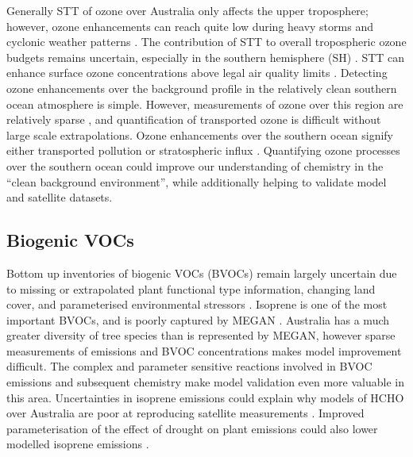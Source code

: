     Generally STT of ozone over Australia only affects the upper troposphere; however, ozone enhancements can reach quite low during heavy storms and cyclonic weather patterns \parencite{Alexander2013}.
    The contribution of STT to overall tropospheric ozone budgets remains uncertain, especially in the southern hemisphere (SH) \parencite{Skerlak2014}.
    STT can enhance surface ozone concentrations above legal air quality limits \parencite[e.g.][]{Lelieveld2009,Lin2015}.
    Detecting ozone enhancements over the background profile in the relatively clean southern ocean atmosphere is simple.
    However, measurements of ozone over this region are relatively sparse \parencite{Skerlak2014}, and quantification of transported ozone is difficult without large scale extrapolations.
    Ozone enhancements over the southern ocean signify either transported pollution or stratospheric influx \parencite{Jacobson2000}.
    Quantifying ozone processes over the southern ocean could improve our understanding of chemistry in the ``clean background environment'', while additionally helping to validate model and satellite datasets.
  
  
  \subsection{Biogenic VOCs}
    
    Bottom up inventories of biogenic VOCs (BVOCs) remain largely uncertain due to missing or extrapolated plant functional type information, changing land cover, and parameterised environmental stressors \parencite{Guenther2000,Kanakidou2005,Millet2006}.
    Isoprene is one of the most important BVOCs, and is poorly captured by MEGAN \parencite{Muller2008, Sindelarova2014, Emmerson2016}.
    Australia has a much greater diversity of tree species than is represented by MEGAN, however sparse measurements of emissions and BVOC concentrations makes model improvement difficult.
    The complex and parameter sensitive reactions involved in BVOC emissions and subsequent chemistry make model validation even more valuable in this area.
    Uncertainties in isoprene emissions could explain why models of HCHO over Australia are poor at reproducing satellite measurements \parencite{Stavrakou2009}.
    Improved parameterisation of the effect of drought on plant emissions could also lower modelled isoprene emissions \parencite{Jiang2018}.
    
